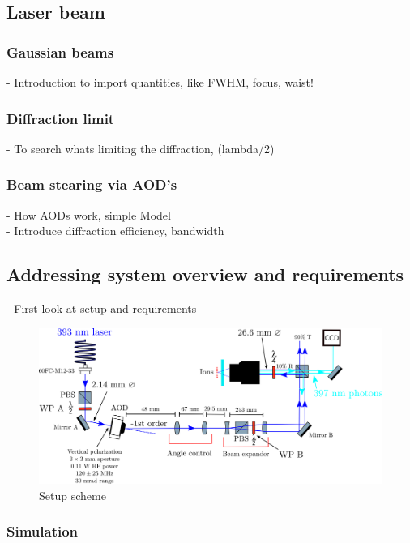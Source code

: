 \documentclass[english, a4paper, 12pt, twoside]{article}
\numberwithin{equation}{section} %
\begin{document}
\subsection{Laser beam}
\subsubsection{Gaussian beams}
- Introduction to import quantities, like FWHM, focus, waist!
\subsubsection{Diffraction limit}
- To search whats limiting the diffraction, (lambda/2)
\subsubsection{Beam stearing via AOD's}
- How AODs work, simple Model\\
- Introduce diffraction efficiency, bandwidth
\subsection{Addressing system overview and requirements}
- First look at setup and requirements

\begin{figure}[H]
\centering
\includegraphics[width=\textwidth]{img/setup}
\caption{Setup scheme}
\end{figure}
\subsubsection{Simulation}
\end{document}
